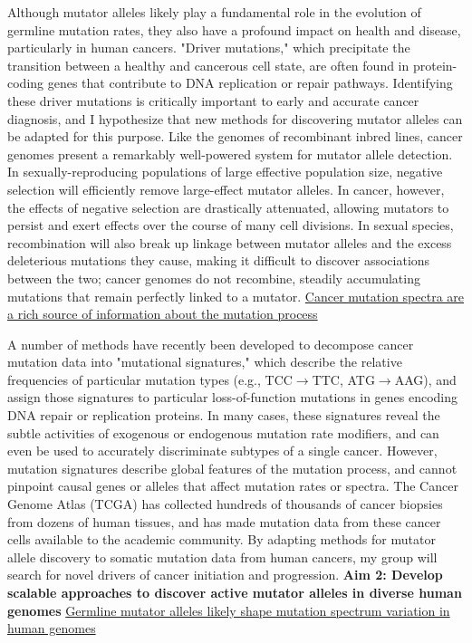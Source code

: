 \documentclass[11pt,a4paper,sans]{moderncv}
\begin{document}
Although mutator alleles likely play a fundamental role in the evolution of 
germline mutation rates, they also have a profound impact on health and disease, 
particularly in human cancers. "Driver mutations," which precipitate the transition
between a healthy and cancerous cell state, are often found in protein-coding genes
that contribute to DNA replication or repair pathways. Identifying these driver
mutations is critically important to early and accurate cancer diagnosis, and 
I hypothesize that new methods for discovering mutator alleles can be adapted 
for this purpose. Like the genomes of recombinant inbred lines, cancer genomes 
present a remarkably well-powered system for mutator allele detection. In 
sexually-reproducing populations of large effective population size, negative 
selection will efficiently remove large-effect mutator alleles. In cancer, 
however, the effects of negative selection are drastically attenuated, allowing 
mutators to persist and exert effects over the course of many cell divisions. 
In sexual species, recombination will also break up linkage between mutator 
alleles and the excess deleterious mutations they cause, making it difficult to
discover associations between the two; cancer genomes do not recombine, steadily
accumulating mutations that remain perfectly linked to a mutator. 
\break \break
\underline{Cancer mutation spectra are a rich source of information about the mutation process}

A number of methods have recently been developed to decompose cancer mutation data 
into "mutational signatures," which describe the relative frequencies of particular 
mutation types (e.g., TCC$\rightarrow$TTC, ATG$\rightarrow$AAG), and assign those signatures to particular 
loss-of-function mutations in genes encoding DNA repair or replication proteins. 
In many cases, these signatures reveal the subtle activities of exogenous or 
endogenous mutation rate modifiers, and can even be used to accurately discriminate 
subtypes of a single cancer. However, mutation signatures describe global features 
of the mutation process, and cannot pinpoint causal genes or alleles that affect 
mutation rates or spectra. The Cancer Genome Atlas (TCGA) has collected hundreds of 
thousands of cancer biopsies from dozens of human tissues, and has made mutation 
data from these cancer cells available to the academic community. By adapting 
methods for mutator allele discovery to somatic mutation data from human cancers, 
my group will search for novel drivers of cancer initiation and progression.
\break \break
\textbf{Aim 2: Develop scalable approaches to discover active mutator alleles in diverse human genomes}
\underline{Germline mutator alleles likely shape mutation spectrum variation in human genomes}
\end{document}
